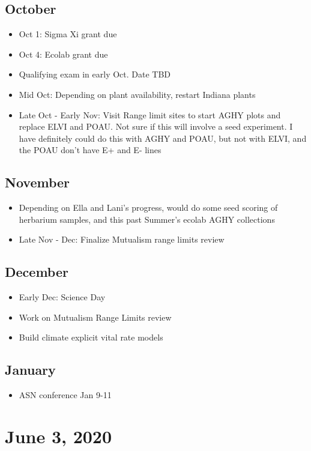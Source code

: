 \documentclass{article}
\begin{document}
\subsection*{October}
\begin{itemize}
\item{Oct 1: Sigma Xi grant due}
\item{Oct 4: Ecolab grant due}
\item{Qualifying exam in early Oct. Date TBD}
\item{Mid Oct: Depending on plant availability, restart Indiana plants}
\item{Late Oct - Early Nov: Visit Range limit sites to start AGHY plots and replace ELVI and POAU. Not sure if this will involve a seed experiment. I have definitely could do this with AGHY and POAU, but not with ELVI, and the POAU don't have E+ and E- lines}
\end{itemize}
\subsection*{November}
\begin{itemize}
\item{Depending on Ella and Lani's progress, would do some seed scoring of herbarium samples, and this past Summer's ecolab AGHY collections}
\item{Late Nov - Dec: Finalize Mutualism range limits review}
\end{itemize}
\subsection*{December}
\begin{itemize}
\item{Early Dec: Science Day}
\item{Work on Mutualism Range Limits review}
\item{Build climate explicit vital rate models}
\end{itemize}
\subsection*{January}
\begin{itemize}
\item{ASN conference Jan 9-11}
\end{itemize}



\section*{June 3, 2020}
\end{document}
